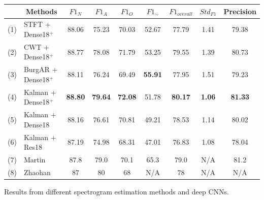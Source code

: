 \documentclass[portrait,a0,final]{a0poster} %
\newcommand{\sectionspace}{10mm} %
\newcommand{\figurespace}{10mm} %
\begin{document}
\begin{minipage}{0.98\linewidth}
\begin{minipage}[t]{0.47\linewidth}
\begin{minipage}[c]{\linewidth}
\vspace{\figurespace}
\begin{tabular}{|l|l|c|c|c|c|c|c|c|}
	\hline
	& \multicolumn{1}{c|}{Methods}           & $F1_N$        & $F1_A$        & $F1_O$      & $F1_\sim$     & $F1_{overall}$  & $Std_{F1}$ & Precision \\ \hline
	(1) & STFT + Dense18$^+$                          & 88.06          & 75.23          & 70.03        & 52.67          & 77.79          & 1.41      & 79.38          \\ \hline
	(2) & CWT + Dense18$^+$                           & 88.77          & 78.08          & 71.79        & 53.25          & 79.55          & 1.39      & 80.73          \\ \hline
	(3) & BurgAR + Dense18$^+$                         & 88.11          & 76.24          & 69.49        & \textbf{55.91} & 77.95          & 1.51      & 79.23          \\ \hline
	(4) & Kalman + Dense18$^+$                        & \textbf{88.80} & \textbf{79.64} & \textbf{72.08}        & 51.78          & \textbf{80.17} & \textbf{1.06}      & \textbf{81.33} \\ \hline
	(5) & Kalman + Dense18                       & 88.16          & 76.61          & 70.81        & 49.21          & 78.53          & 1.14      & 80.02          \\ \hline
	(6) & Kalman + Res18                         & 87.19          & 74.98          & 68.31        & 47.01          & 76.83          & 1.08      & 78.04          \\ \hline
	(7) & Martin & 87.8            & 79.0            & 70.1 & 65.3   & 79.0            & N/A        & 81.2           \\ \hline
	(8) & Zhaohan                                & 87              & 80              & 68            & N/A             & 78              & N/A        & N/A             \\ \hline
\end{tabular}

\vspace{5mm}
Results from different spectrogram estimation methods and deep CNNs.
\end{minipage}

\vspace{\sectionspace}

\end{minipage}
\end{minipage}
\end{document}
